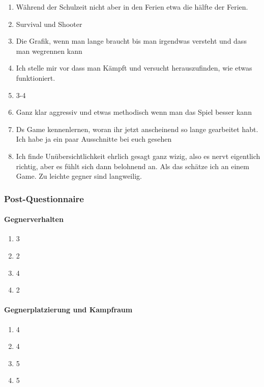\documentclass[../Main.tex]{subfiles}
\begin{document}
\begin{enumerate}[label=\textbf{P\arabic*}, leftmargin=1.5cm, itemsep=0.5em]
    \item Während der Schulzeit nicht aber in den Ferien etwa die hälfte der Ferien.
    \item Survival und Shooter
    \item Die Grafik, wenn man lange braucht bis man irgendwas versteht und dass man wegrennen kann
    \item Ich stelle mir vor dass man Kämpft und versucht herauszufinden, wie etwas funktioniert.
    \item 3-4
    \item Ganz klar aggressiv und etwas methodisch wenn man das Spiel besser kann
    \item Ds Game kennenlernen, woran ihr jetzt anscheinend so lange gearbeitet habt. Ich habe ja ein paar Ausschnitte bei euch gesehen
    \item Ich finde Unübersichtlichkeit ehrlich gesagt ganz wizig, also es nervt eigentlich richtig, aber es fühlt sich dann belohnend an. Als das schätze ich an einem Game. Zu leichte gegner sind langweilig.
\end{enumerate}

\subsubsection{Post-Questionnaire}

\paragraph{Gegnerverhalten}
\begin{enumerate}[label=\textbf{Q\arabic*}, leftmargin=1.5cm, itemsep=0.5em]
    \item 3
    \item 2
    \item 4
    \item 2
\end{enumerate}

\paragraph{Gegnerplatzierung und Kampfraum}
\begin{enumerate}[label=\textbf{Q\arabic*}, leftmargin=1.5cm, itemsep=0.5em, resume]
    \item 4
    \item 4
    \item 5
    \item 5
\end{enumerate}
\end{document}
